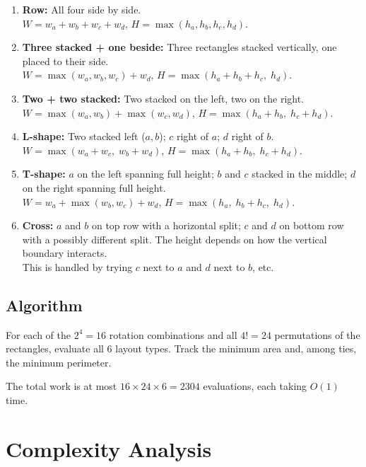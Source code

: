 \documentclass[11pt,a4paper]{article}
\begin{document}
\begin{enumerate}
  \item \textbf{Row:} All four side by side.\\
    $W = w_a + w_b + w_c + w_d$, \;
    $H = \max(h_a, h_b, h_c, h_d)$.

  \item \textbf{Three stacked + one beside:} Three rectangles stacked
    vertically, one placed to their side.\\
    $W = \max(w_a, w_b, w_c) + w_d$, \;
    $H = \max(h_a + h_b + h_c,\; h_d)$.

  \item \textbf{Two + two stacked:} Two stacked on the left, two on the right.\\
    $W = \max(w_a, w_b) + \max(w_c, w_d)$, \;
    $H = \max(h_a + h_b,\; h_c + h_d)$.

  \item \textbf{L-shape:} Two stacked left ($a, b$); $c$ right of $a$;
    $d$ right of $b$.\\
    $W = \max(w_a + w_c,\; w_b + w_d)$, \;
    $H = \max(h_a + h_b,\; h_c + h_d)$.

  \item \textbf{T-shape:} $a$ on the left spanning full height; $b$ and $c$
    stacked in the middle; $d$ on the right spanning full height.\\
    $W = w_a + \max(w_b, w_c) + w_d$, \;
    $H = \max(h_a,\; h_b + h_c,\; h_d)$.

  \item \textbf{Cross:} $a$ and $b$ on top row with a horizontal split; $c$
    and $d$ on bottom row with a possibly different split. The height depends
    on how the vertical boundary interacts.\\
    This is handled by trying $c$ next to $a$ and $d$ next to $b$, etc.
\end{enumerate}

\subsection{Algorithm}

For each of the $2^4 = 16$ rotation combinations and all $4! = 24$
permutations of the rectangles, evaluate all 6 layout types. Track the
minimum area and, among ties, the minimum perimeter.

The total work is at most $16 \times 24 \times 6 = 2304$ evaluations, each
taking $O(1)$ time.

\section{Complexity Analysis}
\end{document}

